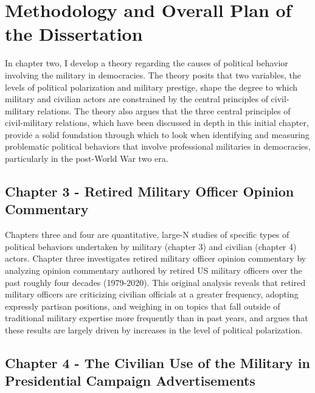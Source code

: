 \documentclass[
  12pt,
  oneside]{memoir}
\begin{document}
\hypertarget{methodology-and-overall-plan-of-the-dissertation}{%
\chapter{Methodology and Overall Plan of the Dissertation}\label{methodology-and-overall-plan-of-the-dissertation}}

In chapter two, I develop a theory regarding the causes of political behavior involving the military in democracies. The theory posits that two variables, the levels of political polarization and military prestige, shape the degree to which military and civilian actors are constrained by the central principles of civil-military relations. The theory also argues that the three central principles of civil-military relations, which have been discussed in depth in this initial chapter, provide a solid foundation through which to look when identifying and measuring problematic political behaviors that involve professional militaries in democracies, particularly in the post-World War two era.

\hypertarget{chapter-3---retired-military-officer-opinion-commentary}{%
\section{Chapter 3 - Retired Military Officer Opinion Commentary}\label{chapter-3---retired-military-officer-opinion-commentary}}

Chapters three and four are quantitative, large-N studies of specific types of political behaviors undertaken by military (chapter 3) and civilian (chapter 4) actors. Chapter three investigates retired military officer opinion commentary by analyzing opinion commentary authored by retired US military officers over the past roughly four decades (1979-2020). This original analysis reveals that retired military officers are criticizing civilian officials at a greater frequency, adopting expressly partisan positions, and weighing in on topics that fall outside of traditional military expertise more frequently than in past years, and argues that these results are largely driven by increases in the level of political polarization.

\hypertarget{chapter-4---the-civilian-use-of-the-military-in-presidential-campaign-advertisements}{%
\section{Chapter 4 - The Civilian Use of the Military in Presidential Campaign Advertisements}\label{chapter-4---the-civilian-use-of-the-military-in-presidential-campaign-advertisements}}
\end{document}
